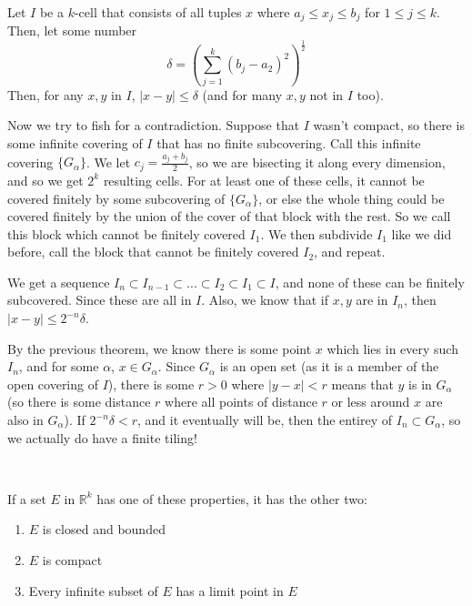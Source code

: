 \documentclass{article}
\begin{document}
\begin{customproof}
\

Let $I$ be a $k$-cell that consists of all tuples $x$ where $a_j \leq x_j \leq b_j$ for $1 \leq j \leq k$. Then, let some number$$\delta = (\sum_{j=1}^k (b_j-a_2)^2)^\frac{1}{2}$$Then, for any $x,y$ in $I$, $\vert x-y \vert \leq \delta$ (and for many $x,y$ not in $I$ too).

Now we try to fish for a contradiction. Suppose that $I$ wasn't compact, so there is some infinite covering of $I$ that has no finite subcovering. Call this infinite covering $\{G_\alpha\}$. We let $c_j = \frac{a_j+b_j}{2}$, so we are bisecting it along every dimension, and so we get $2^k$ resulting cells. For at least one of these cells, it cannot be covered finitely by some subcovering of $\{G_\alpha\}$, or else the whole thing could be covered finitely by the union of the cover of that block with the rest. So we call this block which cannot be finitely covered $I_1$. We then subdivide $I_1$ like we did before, call the block that cannot be finitely covered $I_2$, and repeat. 

We get a sequence $I_n \subset I_{n-1} \subset ... \subset I_2 \subset I_1 \subset I$, and none of these can be finitely subcovered. Since these are all in $I$. Also, we know that if $x,y$ are in $I_n$, then $\vert x-y \vert \leq 2^{-n} \delta$. 

By the previous theorem, we know there is some point $x$ which lies in every such $I_n$, and for some $\alpha$, $x \in G_\alpha$. Since $G_\alpha$ is an open set (as it is a member of the open covering of $I$), there is some $r>0$ where $\vert y - x \vert < r$ means that $y$ is in $G_\alpha$ (so there is some distance $r$ where all points of distance $r$ or less around $x$ are also in $G_\alpha$). If $2^{-n} \delta < r$, and it eventually will be, then the entirey of $I_n \subset G_\alpha$, so we actually do have a finite tiling!
\end{customproof}

\begin{theorem}
\

If a set $E$ in $\mathbb{R}^k$ has one of these properties, it has the other two:

\begin{enumerate}
    \item $E$ is closed and bounded
    \item $E$ is compact
    \item Every infinite subset of $E$ has a limit point in $E$
\end{enumerate}
\end{theorem}
\end{document}
